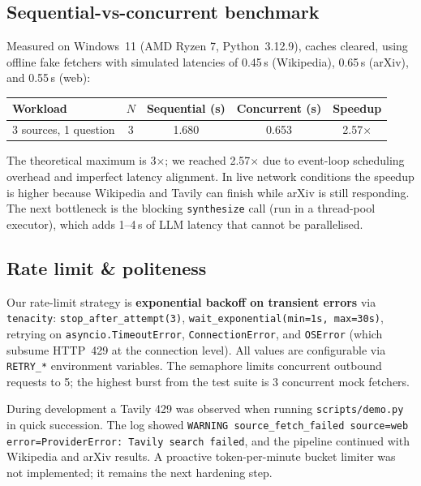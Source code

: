 \documentclass[11pt,a4paper]{article}
\begin{document}
\subsection{Sequential-vs-concurrent benchmark}

Measured on Windows~11 (AMD Ryzen 7, Python~3.12.9), caches cleared, using offline fake fetchers with simulated latencies of 0.45\,s (Wikipedia), 0.65\,s (arXiv), and 0.55\,s (web):

\begin{center}\small
\begin{tabular}{lcccc}
\toprule
\textbf{Workload} & $N$ & \textbf{Sequential (s)} & \textbf{Concurrent (s)} & \textbf{Speedup} \\
\midrule
3 sources, 1 question & 3 & 1.680 & 0.653 & 2.57$\times$ \\
\bottomrule
\end{tabular}
\end{center}

The theoretical maximum is 3$\times$; we reached 2.57$\times$ due to event-loop scheduling overhead and imperfect latency alignment. In live network conditions the speedup is higher because Wikipedia and Tavily can finish while arXiv is still responding. The next bottleneck is the blocking \texttt{synthesize} call (run in a thread-pool executor), which adds 1--4\,s of LLM latency that cannot be parallelised.

\subsection{Rate limit \& politeness}

Our rate-limit strategy is \textbf{exponential backoff on transient errors} via \texttt{tenacity}: \texttt{stop\_after\_attempt(3)}, \texttt{wait\_exponential(min=1s, max=30s)}, retrying on \texttt{asyncio.TimeoutError}, \texttt{ConnectionError}, and \texttt{OSError} (which subsume HTTP~429 at the connection level). All values are configurable via \texttt{RETRY\_*} environment variables. The semaphore limits concurrent outbound requests to 5; the highest burst from the test suite is 3 concurrent mock fetchers.

During development a Tavily 429 was observed when running \texttt{scripts/demo.py} in quick succession. The log showed \texttt{WARNING source\_fetch\_failed source=web error=ProviderError: Tavily search failed}, and the pipeline continued with Wikipedia and arXiv results. A proactive token-per-minute bucket limiter was not implemented; it remains the next hardening step.
\end{document}
